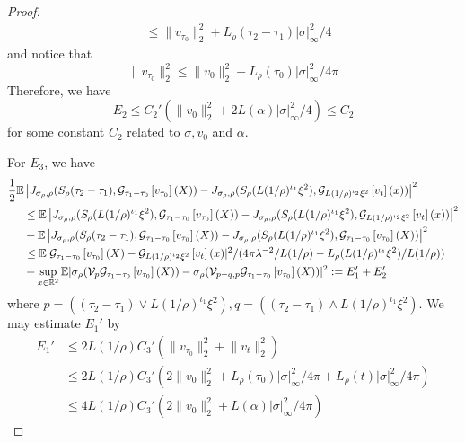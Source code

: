 \begin{proof}
\[\begin{aligned}
        & \leq \lVert v_{\tau_0}\rVert_2^2 + L_{\rho}(\tau_2-\tau_1)|\sigma|_{\infty}^2/4
    \end{aligned}
    \]
    and notice that
    \[
    \lVert v_{\tau_0}\rVert_2^2 \leq \lVert v_0\rVert^2_2 + L_{\rho}(\tau_0)|\sigma|^2_{\infty}/4\pi
    \]
    Therefore, we have
    \[
    E_2 \leq C_2'(\lVert v_0\rVert^2_2 + 2L(\alpha)|\sigma|^2_{\infty}/4) \leq C_2
    \]
    for some constant $C_2$ related to $\sigma, v_0$ and $\alpha$.\par
    For $E_3$, we have
    \[
    \begin{aligned}
    \dfrac{1}{2}\mathbb{E}&\left\lvert
        J_{\sigma_{\rho},\rho}(S_{\rho}(\tau_2-\tau_1),\mathcal{G}_{\tau_1-\tau_0}\left[{v_{\tau_0}}\right](X))
        -
        J_{\sigma_{\rho},\rho}(S_{\rho}(L(1/\rho)^{\iota_1}\xi^2),\mathcal{G}_{L(1/\rho)^{\iota_2}\xi^2}\left[{v_{t}}\right](x))
        \right\rvert^2 \\
    &\leq
    \mathbb{E}\left\lvert
        J_{\sigma_{\rho},\rho}(S_{\rho}(L(1/\rho)^{\iota_1}\xi^2),\mathcal{G}_{\tau_1-\tau_0}\left[{v_{\tau_0}}\right](X))
        -
        J_{\sigma_{\rho},\rho}(S_{\rho}(L(1/\rho)^{\iota_1}\xi^2),\mathcal{G}_{L(1/\rho)^{\iota_2}\xi^2}\left[{v_{t}}\right](x))
        \right\rvert^2
      \\
    &+ 
    \mathbb{E}\left\lvert
        J_{\sigma_{\rho},\rho}(S_{\rho}(\tau_2-\tau_1),\mathcal{G}_{\tau_1-\tau_0}\left[{v_{\tau_0}}\right](X))
        -
        J_{\sigma_{\rho},\rho}(S_{\rho}(L(1/\rho)^{\iota_1}\xi^2),\mathcal{G}_{\tau_1-\tau_0}\left[{v_{\tau_0}}\right](X))
        \right\rvert^2
         \\
    &\leq 
    \mathbb{E}|\mathcal{G}_{\tau_1-\tau_0}\left[{v_{\tau_0}}\right](X) - \mathcal{G}_{L(1/\rho)^{\iota_2}\xi^2}\left[{v_t}\right](x)|^2/(4\pi\lambda^{-2}/L(1/\rho) - L_{\rho}(L(1/\rho)^{\iota_1}\xi^2)/L(1/\rho)) \\
    &+
    \sup_{x\in\mathbb{R}^2}\mathbb{E}\lvert \sigma_{\rho}(\mathcal{V}_{p}\mathcal{G}_{\tau_1-\tau_0}\left[{v_{\tau_0}}\right](X)) - \sigma_{\rho}(\mathcal{V}_{p-q,p}\mathcal{G}_{\tau_1-\tau_0}\left[{v_{\tau_0}}\right](X))\rvert^2 := E_1'+E_2'    \end{aligned}
    \]
    where $ p = ((\tau_2-\tau_1)\vee L(1/\rho)^{\iota_1}\xi^2), q = ((\tau_2-\tau_1)\wedge L(1/\rho)^{\iota_1}\xi^2)$. We may estimate $E_1'$ by
    \[
    \begin{aligned}
        E_1' &\leq 2L(1/\rho)C_3' (\lVert v_{\tau_0}\rVert_2^2 + \lVert v_{t}\rVert_2^2) \\ &\leq 2L(1/\rho)C_3'(2\lVert v_{0}\rVert_2^2 +  L_{\rho}(\tau_0)|\sigma|^2_{\infty}/4\pi +  L_{\rho}(t)|\sigma|^2_{\infty}/4\pi) \\
        &\leq 4L(1/\rho)C_3'(2\lVert v_{0}\rVert_2^2 +  L(\alpha)|\sigma|^2_{\infty}/4\pi)

\end{aligned}\]
\end{proof}
